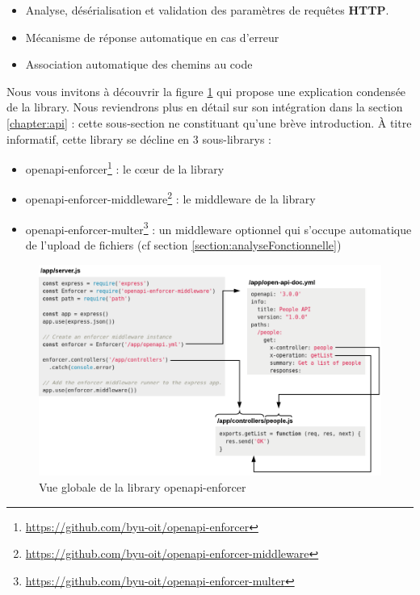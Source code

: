 \begin{itemize}
    \item Analyse, désérialisation et validation des paramètres de requêtes \textbf{HTTP}.
    \item Mécanisme de réponse automatique en cas d'erreur
    \item Association automatique des chemins au code
\end{itemize}

Nous vous invitons à découvrir la figure \ref{fig:OASEnforcer} qui propose une explication condensée de la \gls{library}.
Nous reviendrons plus en détail sur son intégration dans la section \ref{chapter:api} : cette sous-section ne constituant qu'une brève introduction.
À titre informatif, cette \gls{library} se décline en 3 sous-\glspl{library} :

\begin{itemize}
    \item openapi-enforcer\footnote{
        \url{https://github.com/byu-oit/openapi-enforcer}
    } : le cœur de la \gls{library}
    \item openapi-enforcer-middleware\footnote{
        \url{https://github.com/byu-oit/openapi-enforcer-middleware}
    } : le \gls{middleware} de la \gls{library}
    \item openapi-enforcer-multer\footnote{
        \url{https://github.com/byu-oit/openapi-enforcer-multer}
    } : un \gls{middleware} optionnel qui s'occupe automatique de l'upload de fichiers (cf section \ref{section:analyseFonctionnelle})
\end{itemize}

\begin{figure}[H]
    \includegraphics[width=\textwidth,height=\textheight,keepaspectratio]{images/libraries/openapi-enforcer.png}
    \centering
    \caption[Vue globale de la \gls{library} openapi-enforcer]{Vue globale de la \gls{library} openapi-enforcer 
        \footnotemark
    }
    \label{fig:OASEnforcer}
\end{figure}

